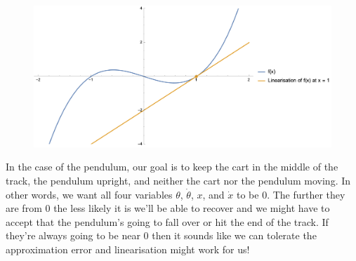 \documentclass{article}
\begin{document}
\begin{figure}[H]
  \centering
  \includegraphics[width=\textwidth]{linearisation}
\end{figure}

In the case of the pendulum, our goal is to keep the cart in the middle of the track, the pendulum upright, and neither the cart nor the pendulum moving. In other words, we want all four variables $\theta$, $\dot{\theta}$, $x$, and $\dot{x}$ to be $0$. The further they are from $0$ the less likely it is we'll be able to recover and we might have to accept that the pendulum's going to fall over or hit the end of the track. If they're always going to be near $0$ then it sounds like we can tolerate the approximation error and linearisation might work for us!
\end{document}

